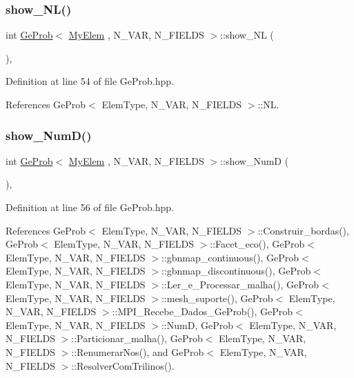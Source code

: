 \subsubsection{\texorpdfstring{show\+\_\+\+N\+L()}{show\_NL()}}
{\footnotesize\ttfamily int \hyperlink{classGeProb}{Ge\+Prob}$<$ \hyperlink{DG__Prob_8h_a83cd887ced9a6587428f267e50cd4787}{My\+Elem} , N\+\_\+\+V\+AR, N\+\_\+\+F\+I\+E\+L\+DS $>$\+::show\+\_\+\+NL (\begin{DoxyParamCaption}{ }\end{DoxyParamCaption})\hspace{0.3cm}{\ttfamily [inline]}, {\ttfamily [inherited]}}



Definition at line 54 of file Ge\+Prob.\+hpp.



References Ge\+Prob$<$ Elem\+Type, N\+\_\+\+V\+A\+R, N\+\_\+\+F\+I\+E\+L\+D\+S $>$\+::\+NL.

\mbox{\label{classGeProb_a95d6202865332fd522738383003d7b25}} 
\subsubsection{\texorpdfstring{show\+\_\+\+Num\+D()}{show\_NumD()}}
{\footnotesize\ttfamily int \hyperlink{classGeProb}{Ge\+Prob}$<$ \hyperlink{DG__Prob_8h_a83cd887ced9a6587428f267e50cd4787}{My\+Elem} , N\+\_\+\+V\+AR, N\+\_\+\+F\+I\+E\+L\+DS $>$\+::show\+\_\+\+NumD (\begin{DoxyParamCaption}{ }\end{DoxyParamCaption})\hspace{0.3cm}{\ttfamily [inline]}, {\ttfamily [inherited]}}



Definition at line 56 of file Ge\+Prob.\+hpp.



References Ge\+Prob$<$ Elem\+Type, N\+\_\+\+V\+A\+R, N\+\_\+\+F\+I\+E\+L\+D\+S $>$\+::\+Construir\+\_\+bordas(), Ge\+Prob$<$ Elem\+Type, N\+\_\+\+V\+A\+R, N\+\_\+\+F\+I\+E\+L\+D\+S $>$\+::\+Facet\+\_\+eco(), Ge\+Prob$<$ Elem\+Type, N\+\_\+\+V\+A\+R, N\+\_\+\+F\+I\+E\+L\+D\+S $>$\+::gbnmap\+\_\+continuous(), Ge\+Prob$<$ Elem\+Type, N\+\_\+\+V\+A\+R, N\+\_\+\+F\+I\+E\+L\+D\+S $>$\+::gbnmap\+\_\+discontinuous(), Ge\+Prob$<$ Elem\+Type, N\+\_\+\+V\+A\+R, N\+\_\+\+F\+I\+E\+L\+D\+S $>$\+::\+Ler\+\_\+e\+\_\+\+Processar\+\_\+malha(), Ge\+Prob$<$ Elem\+Type, N\+\_\+\+V\+A\+R, N\+\_\+\+F\+I\+E\+L\+D\+S $>$\+::mesh\+\_\+suporte(), Ge\+Prob$<$ Elem\+Type, N\+\_\+\+V\+A\+R, N\+\_\+\+F\+I\+E\+L\+D\+S $>$\+::\+M\+P\+I\+\_\+\+Recebe\+\_\+\+Dados\+\_\+\+Ge\+Prob(), Ge\+Prob$<$ Elem\+Type, N\+\_\+\+V\+A\+R, N\+\_\+\+F\+I\+E\+L\+D\+S $>$\+::\+NumD, Ge\+Prob$<$ Elem\+Type, N\+\_\+\+V\+A\+R, N\+\_\+\+F\+I\+E\+L\+D\+S $>$\+::\+Particionar\+\_\+malha(), Ge\+Prob$<$ Elem\+Type, N\+\_\+\+V\+A\+R, N\+\_\+\+F\+I\+E\+L\+D\+S $>$\+::\+Renumerar\+Nos(), and Ge\+Prob$<$ Elem\+Type, N\+\_\+\+V\+A\+R, N\+\_\+\+F\+I\+E\+L\+D\+S $>$\+::\+Resolver\+Com\+Trilinos().

